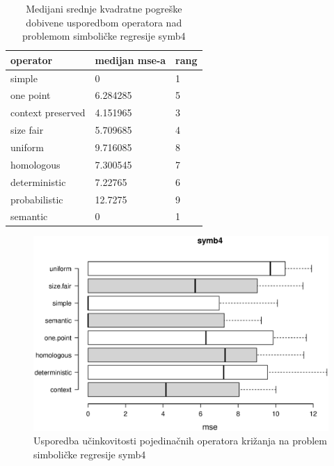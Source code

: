 \begin{table}[H]
 	\centering
\caption{Medijani srednje kvadratne pogreške dobivene usporedbom operatora nad problemom simboličke regresije symb4}
    \begin{tabular}{| l | l | l |}
    \hline
    \textbf{operator} & \textbf{medijan mse-a} & \textbf{rang}\\ \hline
    simple & 0 & 1\\ \hline
    one point & 6.284285 & 5\\ \hline
    context preserved & 4.151965 & 3\\ \hline
    size fair & 5.709685 & 4\\ \hline
    uniform & 9.716085 & 8\\ \hline
    homologous & 7.300545 & 7\\ \hline
    deterministic & 7.22765 & 6\\ \hline
    probabilistic & 12.7275 & 9\\ \hline
    semantic & 0 & 1\\ \hline
    \end{tabular}
    
    
    \label{symb4table}
\end{table}

\begin{figure}[H]
	\centering
	\includegraphics[trim=0cm 4cm 0cm 0cm, scale=0.6]{./slike/boxPlots/symb4.eps}
	\caption{Usporedba učinkovitosti pojedinačnih operatora križanja na problem simboličke regresije symb4}
	\label{symb4box}
\end{figure}


